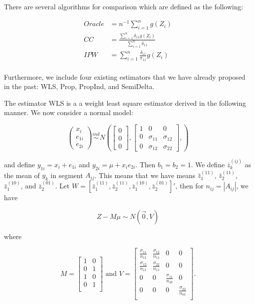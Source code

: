 \documentclass[
  letterpaper,
  DIV=11,
  numbers=noendperiod]{scrartcl}
\begin{document}
There are several algorithms for comparison which are defined as the
following:

\begin{align*}
  Oracle &= n^{-1} \sum_{i = 1}^n g(Z_i)\\
  CC &= \frac{\sum_{i = 1}^n \delta_{11} g(Z_i)}{\sum_{i = 1}^n \delta_{11}} \\
  IPW &= \sum_{i = 1}^n \frac{\delta_{11}}{\pi_{11}} g(Z_i)\\
\end{align*}

Furthermore, we include four existing estimators that we have already
proposed in the past: WLS, Prop, PropInd, and SemiDelta.

The estimator WLS is a a weight least square estimator derived in the
following manner. We now consider a normal model:

\[ 
  \begin{pmatrix}
    x_i \\ e_{1i} \\ e_{2i}
  \end{pmatrix} \stackrel{ind}{\sim}
  N \left(
  \begin{bmatrix}
    0 \\ 0 \\ 0
  \end{bmatrix},
  \begin{bmatrix}
    1 & 0 & 0 \\
    0 & \sigma_{11} & \sigma_{12} \\ 
    0 & \sigma_{12} & \sigma_{22}
  \end{bmatrix},
  \right)
\]

and define \(y_{1i} = x_i + e_{1i}\) and \(y_{2i} = \mu + x_i e_{2i}\).
Then \(b_1 = b_2 = 1\). We define \(\bar z_k^{(ij)}\) as the mean of
\(y_k\) in segment \(A_{ij}\). This means that we have means
\(\bar z_1^{(11)}\), \(\bar z_2^{(11)}\), \(\bar z_1^{(10)}\), and
\(\bar z_2^{(01)}\). Let
\(W = [\bar z_1^{(11)}, \bar z_2^{(11)}, \bar z_1^{(10)}, \bar z_2^{(01)}]'\),
then for \(n_{ij} = |A_{ij}|\), we have

\[Z - M \mu \sim N(\vec 0, V)\]

where

\[M = 
  \begin{bmatrix}
    1 & 0 \\
    0 & 1 \\
    1 & 0 \\
    0 & 1 \\
  \end{bmatrix}
  \text{ and }
  V = 
  \begin{bmatrix}
    \frac{\sigma_{11}}{n_{11}} & \frac{\sigma_{12}}{n_{11}} & 0 & 0 \\
    \frac{\sigma_{12}}{n_{11}} & \frac{\sigma_{22}}{n_{11}} & 0 & 0 \\
    0 & 0 & \frac{\sigma_{11}}{n_{10}} & 0 \\
    0 & 0 & 0 & \frac{\sigma_{22}}{n_{01}} \\
  \end{bmatrix}.
\]
\end{document}
